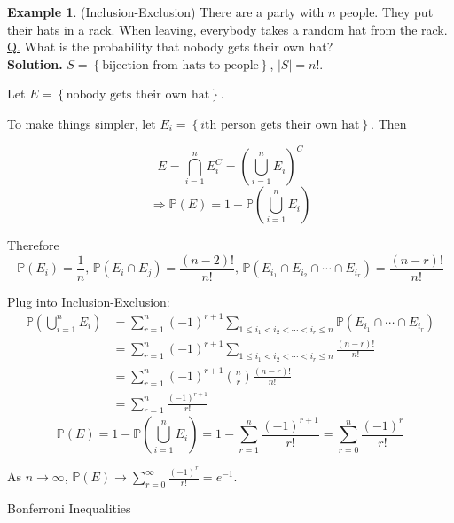 \documentclass[a4paper,11pt]{amsbook}
\makeatletter
\def\section{\@startsection{section}{2}%
    \z@{1\linespacing\@plus1\linespacing}{.5\linespacing}%
    {\large\normalfont\bfseries\centering\color{darkblue}}}
\theoremstyle{definition}
\newtheorem{example}{\hspace{-2em} \color{darkblue} Example}[chapter]
\theoremstyle{remark}
\renewcommand{\P}{\mathbb{P}}
\newcommand\0{\varnothing}
\makeatother
\begin{document}
    \begin{example} \label{party} (Inclusion-Exclusion)
        There are a party with $n$ people.
        They put their hats in a rack.
        When leaving, everybody takes a random hat from the rack.\\
        \underline{Q.} What is the probability that nobody gets their own hat?\\
        \textbf{Solution.}
        $S=\left\{\text{bijection from hats to people}\right\}$, $|S|=n!$.

        Let $E=\left\{\text{nobody gets their own hat}\right\}$.

        To make things simpler, let $E_i=\left\{i\text{th person gets their own hat}\right\}$. Then

        $$E=\bigcap_{i=1}^nE_i^C=\left(\bigcup_{i=1}^nE_i\right)^C$$
        $$\Rightarrow\P(E)=1-\P\left(\bigcup_{i=1}^nE_i\right)$$

        Therefore
        $$\P(E_i)=\frac1n,\,\P(E_i\cap E_j)=\frac{(n-2)!}{n!},\,
        \P(E_{i_1}\cap E_{i_2}\cap\cdots\cap E_{i_r})=\frac{(n-r)!}{n!}$$

        Plug into Inclusion-Exclusion:
        \begin{align*}
            \P\left(\bigcup_{i=1}^nE_i\right)&=\sum_{r=1}^n(-1)^{r+1}\sum_{1\leq i_1<i_2<\cdots<i_r\leq n}\P(E_{i_1}\cap\cdots\cap E_{i_r}) \\
            &=\sum_{r=1}^n(-1)^{r+1}\sum_{1\leq i_1<i_2<\cdots<i_r\leq n}\frac{(n-r)!}{n!} \\
            &=\sum_{r=1}^n(-1)^{r+1}\binom nr\frac{(n-r)!}{n!} \\
            &=\sum_{r=1}^n\frac{(-1)^{r+1}}{r!}
        \end{align*}
        $$\P(E)=1-\P\left(\bigcup_{i=1}^nE_i\right)=1-\sum_{r=1}^n\frac{(-1)^{r+1}}{r!}=\sum_{r=0}^n\frac{(-1)^r}{r!}$$
        
        As $n\to\infty$, $\P(E)\to\sum_{r=0}^\infty\frac{(-1)^r}{r!}=e^{-1}$.
    \end{example}

    \section{Bonferroni Inequalities}
\end{document}
